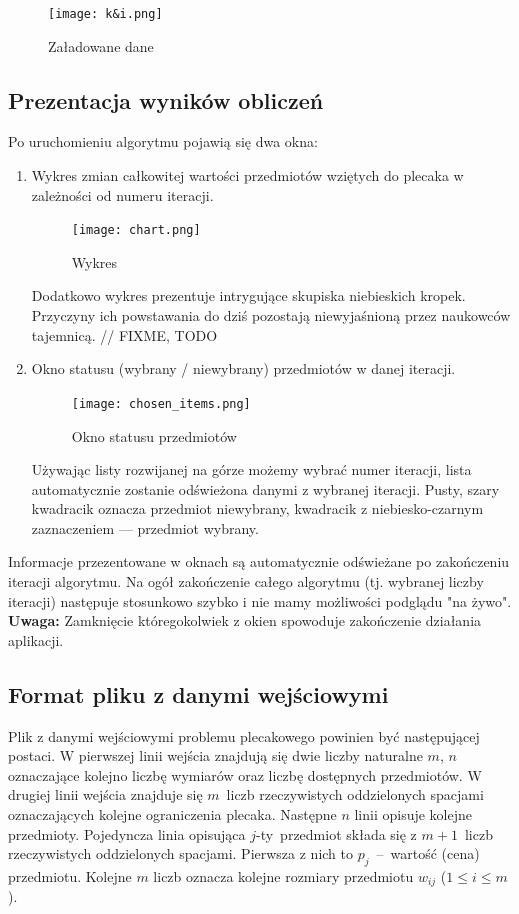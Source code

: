 \documentclass[a4paper,12pt,notitlepage]{mwrep}
\begin{document}
\begin{figure}[H]
\centering
\texttt{[image: k\&i.png]}
\caption{Załadowane dane}
\label{fig:ki}
\end{figure}

\subsection{Prezentacja wyników obliczeń}
Po uruchomieniu algorytmu pojawią się dwa okna:
\begin{enumerate}
	\item	Wykres zmian całkowitej wartości przedmiotów wziętych do plecaka
			w zależności od numeru iteracji.\\
			\begin{figure}[H]
			\centering
			\texttt{[image: chart.png]}
			\caption{Wykres}
			\label{fig:chart}
			\end{figure}
			Dodatkowo wykres prezentuje intrygujące skupiska niebieskich kropek.\\
			Przyczyny ich powstawania do dziś pozostają niewyjaśnioną przez
			naukowców tajemnicą. // FIXME, TODO
	\item	Okno statusu (wybrany / niewybrany) przedmiotów w danej iteracji.\\
			\begin{figure}[H]
			\centering
			\texttt{[image: chosen\_items.png]}
			\caption{Okno statusu przedmiotów}
			\label{fig:chosen_items}
			\end{figure}
			Używając listy rozwijanej na górze możemy wybrać numer iteracji,
			lista automatycznie zostanie odświeżona danymi z wybranej iteracji.
			Pusty, szary kwadracik oznacza przedmiot niewybrany, kwadracik z niebiesko-czarnym
			zaznaczeniem --- przedmiot wybrany.
\end{enumerate}
Informacje przezentowane w oknach są automatycznie odświeżane po zakończeniu iteracji
algorytmu. Na ogół zakończenie całego algorytmu (tj. wybranej liczby iteracji) następuje
stosunkowo szybko i nie mamy możliwości podglądu "na żywo".\\
\textbf{Uwaga:} Zamknięcie któregokolwiek z okien spowoduje zakończenie działania aplikacji.


\subsection{Format pliku z danymi wejściowymi} \label{format}
Plik z danymi wejściowymi problemu plecakowego powinien być następującej postaci. W pierwszej
linii wejścia znajdują się dwie liczby naturalne $m$, $n$ oznaczające kolejno liczbę wymiarów
oraz liczbę dostępnych przedmiotów. W drugiej linii wejścia znajduje się $m$~liczb rzeczywistych oddzielonych
spacjami oznaczających kolejne ograniczenia plecaka. Następne $n$ linii opisuje kolejne przedmioty.
Pojedyncza linia opisująca $j$-ty~przedmiot składa się z $m+1$~liczb rzeczywistych oddzielonych spacjami.
Pierwsza z nich to $p_j$~--~wartość (cena)
przedmiotu. Kolejne $m$ liczb oznacza kolejne rozmiary przedmiotu $w_{ij}$  ($1 \le i \le m$).
\end{document}
